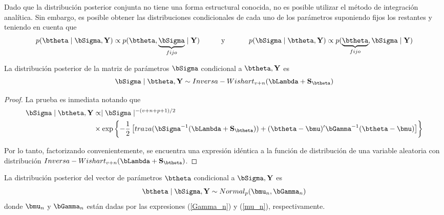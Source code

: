 \documentclass[10pt,openright]{book}\usepackage[]{graphicx}\usepackage[]{color}
\begin{document}
Dado que la distribuci\'on posterior conjunta no tiene una forma estructural conocida, no es posible utilizar el m\'etodo de integraci\'on anal\'itica. Sin embargo, es posible obtener las distribuciones condicionales de cada uno de los par\'ametros suponiendo fijos los restantes y teniendo en cuenta que
\begin{align*}
p(\btheta \mid \bSigma,\mathbf{Y})\propto p(\btheta,\underbrace{\bSigma}_{fijo} \mid \mathbf{Y})
\ \ \ \ \ \ \ \ \ \text{y} \ \ \ \ \ \ \ \ \ \
p(\bSigma \mid \btheta,\mathbf{Y})\propto p(\underbrace{\btheta}_{fijo},\bSigma \mid \mathbf{Y})
\end{align*}

\begin{Res}
La distribuci\'on posterior de la matriz de par\'ametros $\bSigma$ condicional a $\btheta,\mathbf{Y}$ es
\begin{equation*}\label{Pos_Cond_bSigma}
\bSigma \mid \btheta,\mathbf{Y} \sim Inversa-Wishart_{v+n}(\bLambda+\mathbf{S}_{\btheta})
\end{equation*}
\end{Res}

\begin{proof}
La prueba es inmediata notando que
\begin{align*}
\bSigma \mid \btheta,\mathbf{Y}&\propto\mid \bSigma \mid ^{-(v+n+p+1)/2}\notag\\
&\times\exp\left\{ -\frac{1}{2}\left[traza(\bSigma^{-1}(\bLambda+\mathbf{S}_{\btheta}))+(\btheta-\bmu)'\bGamma^{-1}(\btheta-\bmu)\right]\right\}
\end{align*}

Por lo tanto, factorizando convenientemente, se encuentra una expresi\'on id\'entica a la funci\'on de distribuci\'on de una variable aleatoria con distribuci\'on $Inversa-Wishart_{v+n}(\bLambda+\mathbf{S}_{\btheta})$.
\end{proof}
                          
\begin{Res}
La distribuci\'on posterior del vector de par\'ametros $\btheta$ condicional a $\bSigma,\mathbf{Y}$ es
\begin{equation}\label{Pos_Cond_btheta}
\btheta \mid  \bSigma,\mathbf{Y} \sim Normal_p(\bmu_n,\bGamma_n)
\end{equation}
donde $\bmu_n$ y $\bGamma_n$ est\'an dadas por las expresiones (\ref{Gamma_n}) y (\ref{mu_n}), respectivamente.
\end{Res}
                              
\end{document}
